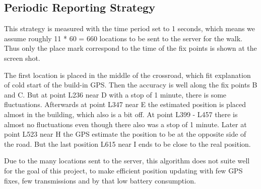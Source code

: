 \subsection{Periodic Reporting Strategy}
This strategy is measured with the time period set to 1 seconds, which means we assume roughly 11 * 60 = 660 locations to be sent to the server for the walk. Thus only the place mark correspond to the time of the fix points is shown at the screen shot. 

The first location is placed in the middle of the crossroad, which fit explanation of cold start of the build-in GPS. Then the accuracy is well along the fix points B and C. But at point L236 near D with a stop of 1 minute, there is some fluctuations. Afterwards at point L347 near E the estimated position is placed almost in the building, which also is a bit off. At point L399 - L457 there is almost no fluctuations even though there also was a stop of 1 minute. Later at point L523 near H the GPS estimate the position to be at the opposite side of the road. But the last position L615 near I ends to be close to the real position.

Due to the many locations sent to the server, this algorithm does not suite well for the goal of this project, to make efficient position updating with few GPS fixes, few transmissions and by that low battery consumption.